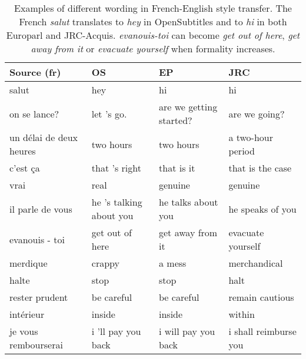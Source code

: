 \documentclass[11pt,a4paper]{article}
\begin{document}
\begin{table}[]
\small
\begin{tabular}{|p{1.5cm}|p{1.5cm}|p{1.5cm}|p{1.5cm}|}
\hline
\textbf{Source (fr)}                  & \textbf{OS}                      & \textbf{EP}                       & \textbf{JRC}                     \\ \hline
salut                   & hey                     & hi                       & hi                      \\ \hline
on se lance?            & let 's go.             & are we getting started? & are we going?          \\ \hline
un d{\'e}lai de deux heures & two hours               & two hours                & a two-hour period       \\ \hline
c'est {\c c}a              & that 's right         & that is it             & that is the case      \\ \hline
vrai                    & real                    & genuine                  & genuine                 \\ \hline
il parle de vous        & he 's talking about you & he talks about you       & he speaks of you        \\ \hline
evanouis - toi        & get out of here       & get away from it       & evacuate yourself     \\ \hline
merdique                & crappy                  & a mess                   & merchandical            \\ \hline
halte                   & stop                    & stop                     & halt                    \\ \hline
rester prudent          & be careful              & be careful               & remain cautious         \\ \hline
int{\'e}rieur               & inside                  & inside                   & within                  \\ \hline
je vous rembourserai  & i 'll pay you back    & i will pay you back    & i shall reimburse you \\ \hline
\end{tabular}
\caption{\small Examples of different wording in French-English style transfer. The French \textit{salut} translates to \textit{hey} in OpenSubtitles and to \textit{hi} in both Europarl and JRC-Acquis. \textit{evanouis-toi} can become \textit{get out of here}, \textit{get away from it} or \textit{evacuate yourself} when formality increases.
      }
      \label{tab-frenexamples}
\end{table}
\end{document}
